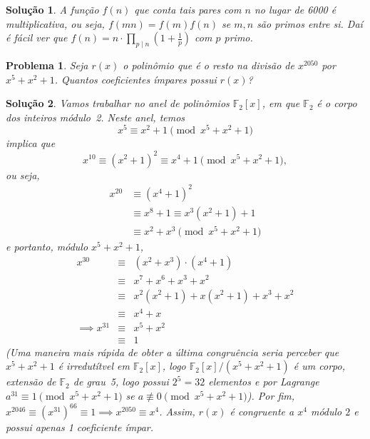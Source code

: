\documentclass{hipatia}
\newtheorem{problem*}{Problema}
\newtheorem*{solution*}{Solução}
\begin{document}
\begin{solution*}
A função $f(n)$ que conta tais pares com $n$ no lugar de 6000 é multiplicativa, ou seja, $f(mn) = f(m)f(n)$ se $m,n$ são primos entre si.  Daí é fácil ver que $f(n) =n \cdot \prod_{p\mid n} (1 + \frac{1}{p})$ com $p$ primo.
\end{solution*}

\begin{problem*}
Seja $r(x)$ o polinômio que é o resto na divisão de $x^{2050}$ por $x^5 + x^2  +1$.  Quantos coeficientes ímpares possui $r(x)$?
\end{problem*}



\begin{solution*}
Vamos trabalhar no anel de polinômios 
$\mathbb{F}_2[x]$, em que $\mathbb{F}_2$ é 
o corpo dos inteiros módulo~2.  Neste anel, temos
$$  x^5 \equiv x^2 + 1 \pmod{x^5 + x^2 + 1}$$
implica que
$$  x^{10} \equiv (x^2 + 1)^2 \equiv x^4 + 1 \pmod{x^5 + x^2 + 1},$$
ou seja,
  \begin{align*}
  x^{20} &\equiv (x^4 + 1)^2 \\ 
  & \equiv x^8 + 1 \equiv x^3 (x^2+1) + 1 \\
  &\equiv x^2 + x^3 \pmod{x^5 + x^2 + 1}
  \end{align*}
e portanto, módulo $x^5 + x^2 + 1$,
\begin{eqnarray*}
    x^{30} &\equiv& (x^2 + x^3)\cdot (x^4 + 1) \\             &\equiv& x^7 + x^6 + x^3 + x^2\\
           &\equiv& x^2(x^2+1) + x(x^2+1) + x^3 + x^2\\ &\equiv& x^4 + x\\
    \implies x^{31} &\equiv& x^5 + x^2 \\
    &\equiv& 1
\end{eqnarray*}
(Uma maneira mais rápida de obter a última congruência seria perceber que $x^5 + x^2 + 1$ é irredutítvel em $\mathbb{F}_2[x]$, logo $\mathbb{F}_2[x]/(x^5 + x^2 + 1)$ é um corpo, extensão de $\mathbb{F}_2$ de grau~5, logo possui $2^5 = 32$ elementos e por Lagrange $a^{31} \equiv 1 \pmod{x^5 + x^2 + 1}$ se $a\not\equiv 0 \pmod{x^5 + x^2 + 1}$).
Por fim, $x^{2046} \equiv (x^{31})^{66} \equiv 1 \implies x^{2050} \equiv x^4$.  Assim, $r(x)$ é congruente a $x^4$ módulo $2$ e possui apenas 1 coeficiente ímpar.
\end{solution*}
\end{document}
